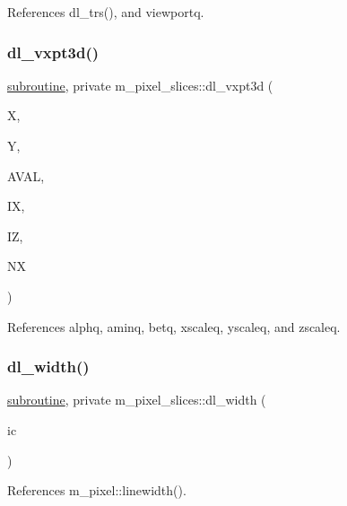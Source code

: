 References dl\+\_\+trs(), and viewportq.

\mbox{\label{namespacem__pixel__slices_a61f419d67b700758eceed72e406a37f0}} 
\subsubsection{\texorpdfstring{dl\+\_\+vxpt3d()}{dl\_vxpt3d()}}
{\footnotesize\ttfamily \hyperlink{M__stopwatch_83_8txt_acfbcff50169d691ff02d4a123ed70482}{subroutine}, private m\+\_\+pixel\+\_\+slices\+::dl\+\_\+vxpt3d (\begin{DoxyParamCaption}\item[{}]{X,  }\item[{}]{Y,  }\item[{}]{A\+V\+AL,  }\item[{}]{IX,  }\item[{}]{IZ,  }\item[{}]{NX }\end{DoxyParamCaption})\hspace{0.3cm}{\ttfamily [private]}}



References alphq, aminq, betq, xscaleq, yscaleq, and zscaleq.

\mbox{\label{namespacem__pixel__slices_a2a4bb6da0ae36c65fdf05996e3ae5487}} 
\subsubsection{\texorpdfstring{dl\+\_\+width()}{dl\_width()}}
{\footnotesize\ttfamily \hyperlink{M__stopwatch_83_8txt_acfbcff50169d691ff02d4a123ed70482}{subroutine}, private m\+\_\+pixel\+\_\+slices\+::dl\+\_\+width (\begin{DoxyParamCaption}\item[{}]{ic }\end{DoxyParamCaption})\hspace{0.3cm}{\ttfamily [private]}}



References m\+\_\+pixel\+::linewidth().



